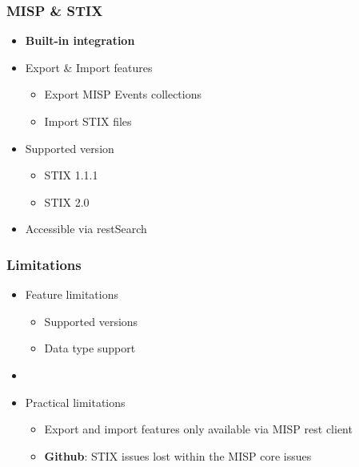 
\begin{frame}[t,plain]
\titlepage
\end{frame}

\begin{frame}
    \frametitle{MISP \& STIX}
    \begin{itemize}
        \item{\bf Built-in integration}
        \item Export \& Import features
        \begin{itemize}
            \item Export MISP Events collections
            \item Import STIX files
        \end{itemize}
        \item Supported version
        \begin{itemize}
            \item STIX 1.1.1
            \item STIX 2.0
        \end{itemize}
        \item Accessible via restSearch
    \end{itemize}
\end{frame}

\begin{frame}
    \frametitle{Limitations}
    \begin{itemize}
        \item Feature limitations
        \begin{itemize}
            \item Supported versions
            \item Data type support
        \end{itemize}
        \item []
        \item Practical limitations
        \begin{itemize}
            \item Export and import features only available via MISP rest client
            \item {\bf Github}: STIX issues lost within the MISP core issues
        \end{itemize}
    \end{itemize}
\end{frame}

